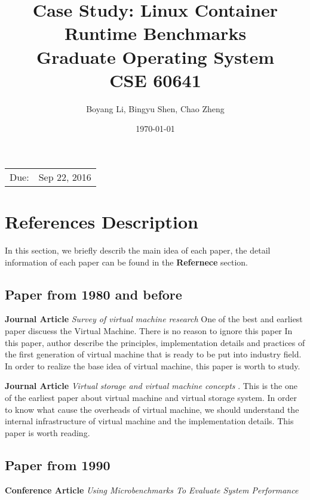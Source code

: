 \documentclass{article}
\title{Case Study: Linux Container Runtime Benchmarks \\ Graduate Operating System \\ CSE 60641} %
\date{\today} %
\author{Boyang Li, Bingyu Shen, Chao Zheng}
\begin{document}
\maketitle %

\begin{center}
\begin{tabular}{l r}
Due: & Sep 22, 2016\\ 
\end{tabular}
\end{center}

\section{References Description}

In this section, we briefly describ the main idea of each paper, the detail information of each
paper can be found in the \textbf{Refernece} section.

\subsection{Paper from 1980 and before}

\textbf{Journal Article} \emph{Survey of virtual machine research}\cite{goldberg1974survey} One
of the best and earliest paper discuess the Virtual Machine. There is no reason to ignore this paper  
In this paper, author describe the principles, implementation details and practices of the first
generation of virtual machine that is ready to be put into industry field. In order to realize the
base idea of virtual machine, this paper is worth to study. 

\medskip

\textbf{Journal Article} \emph{Virtual storage and virtual machine concepts}
\cite{parmelee1972virtual}. This is the one of the earliest paper about virtual machine 
and virtual storage system. In order to know what cause the overheads of virtual machine, we should
understand the internal infrastructure of virtual machine and the implementation details. This paper 
is worth reading.

\subsection{Paper from 1990}

\textbf{Conference Article} \emph{Using Microbenchmarks To Evaluate System Performance}
\cite{bershad1992using}

\medskip
\end{document}
